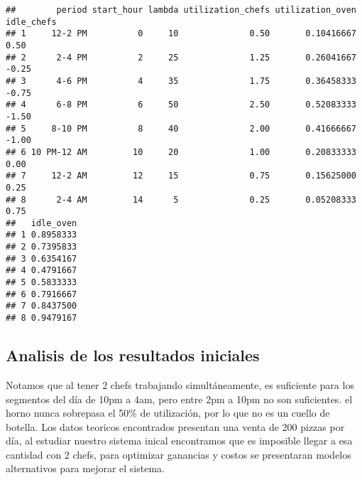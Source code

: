 \documentclass[
]{article}
\begin{document}
\begin{verbatim}
##        period start_hour lambda utilization_chefs utilization_oven idle_chefs
## 1     12-2 PM          0     10              0.50       0.10416667       0.50
## 2      2-4 PM          2     25              1.25       0.26041667      -0.25
## 3      4-6 PM          4     35              1.75       0.36458333      -0.75
## 4      6-8 PM          6     50              2.50       0.52083333      -1.50
## 5     8-10 PM          8     40              2.00       0.41666667      -1.00
## 6 10 PM-12 AM         10     20              1.00       0.20833333       0.00
## 7     12-2 AM         12     15              0.75       0.15625000       0.25
## 8      2-4 AM         14      5              0.25       0.05208333       0.75
##   idle_oven
## 1 0.8958333
## 2 0.7395833
## 3 0.6354167
## 4 0.4791667
## 5 0.5833333
## 6 0.7916667
## 7 0.8437500
## 8 0.9479167
\end{verbatim}

\subsection{Analisis de los resultados
iniciales}\label{analisis-de-los-resultados-iniciales}

Notamos que al tener 2 chefs trabajando simultáneamente, es suficiente
para los segmentos del día de 10pm a 4am, pero entre 2pm a 10pm no son
suficientes. el horno nunca sobrepasa el 50\% de utilización, por lo que
no es un cuello de botella. Los datos teoricos encontrados presentan una
venta de 200 pizzas por día, al estudiar nuestro sistema inical
encontramos que es imposible llegar a esa cantidad con 2 chefs, para
optimizar ganancias y costos se presentaran modelos alternativos para
mejorar el sistema.
\end{document}
